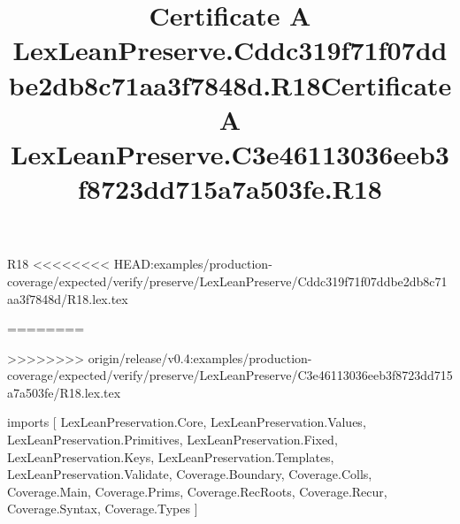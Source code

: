 \begin{lexlean}{R18}
<<<<<<<< HEAD:examples/production-coverage/expected/verify/preserve/LexLeanPreserve/Cddc319f71f07ddbe2db8c71aa3f7848d/R18.lex.tex
\title{Certificate A LexLeanPreserve.Cddc319f71f07ddbe2db8c71aa3f7848d.R18}
========
\title{Certificate A LexLeanPreserve.C3e46113036eeb3f8723dd715a7a503fe.R18}
>>>>>>>> origin/release/v0.4:examples/production-coverage/expected/verify/preserve/LexLeanPreserve/C3e46113036eeb3f8723dd715a7a503fe/R18.lex.tex
\begin{coremodule}
imports [
  LexLeanPreservation.Core,
  LexLeanPreservation.Values,
  LexLeanPreservation.Primitives,
  LexLeanPreservation.Fixed,
  LexLeanPreservation.Keys,
  LexLeanPreservation.Templates,
  LexLeanPreservation.Validate,
  Coverage.Boundary,
  Coverage.Colls,
  Coverage.Main,
  Coverage.Prims,
  Coverage.RecRoots,
  Coverage.Recur,
  Coverage.Syntax,
  Coverage.Types
]


\end{coremodule}
\end{lexlean}
